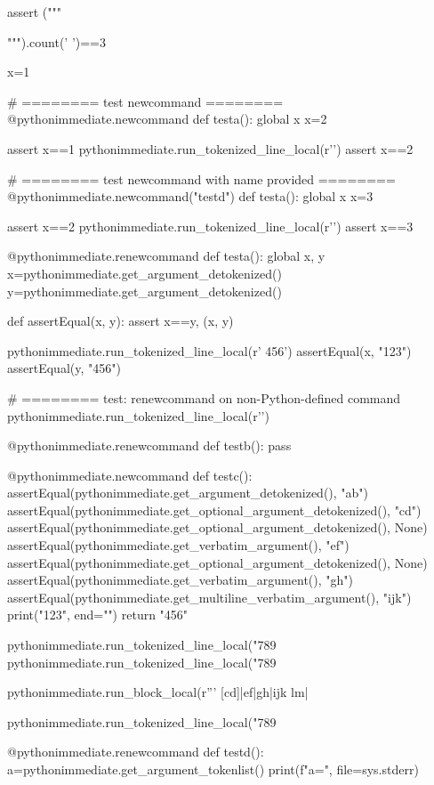 \documentclass[a5paper]{article}
\begin{document}
\begin{pycode}
assert ("""
   
""").count(' ')==3

x=1

# ======== test newcommand ========
@pythonimmediate.newcommand
def testa():
	global x
	x=2

assert x==1
pythonimmediate.run_tokenized_line_local(r'\testa')
assert x==2

# ======== test newcommand with name provided ========
@pythonimmediate.newcommand("testd")
def testa():
	global x
	x=3

assert x==2
pythonimmediate.run_tokenized_line_local(r'\testd')
assert x==3

@pythonimmediate.renewcommand
def testa():
	global x, y
	x=pythonimmediate.get_argument_detokenized()
	y=pythonimmediate.get_argument_detokenized()


def assertEqual(x, y):
	assert x==y, (x, y)


pythonimmediate.run_tokenized_line_local(r' {456}')
assertEqual(x, "123")
assertEqual(y, "456")


# ======== test: renewcommand on non-Python-defined command
pythonimmediate.run_tokenized_line_local(r'\def \testb {}')

@pythonimmediate.renewcommand
def testb(): pass



@pythonimmediate.newcommand
def testc():
	assertEqual(pythonimmediate.get_argument_detokenized(), "ab")
	assertEqual(pythonimmediate.get_optional_argument_detokenized(), "cd")
	assertEqual(pythonimmediate.get_optional_argument_detokenized(), None)
	assertEqual(pythonimmediate.get_verbatim_argument(), "ef")
	assertEqual(pythonimmediate.get_optional_argument_detokenized(), None)
	assertEqual(pythonimmediate.get_verbatim_argument(), "gh")
	assertEqual(pythonimmediate.get_multiline_verbatim_argument(), "ijk\nlm")
	print("123", end="")
	return "456"

pythonimmediate.run_tokenized_line_local("789%
pythonimmediate.run_tokenized_line_local("789%

pythonimmediate.run_block_local(r''' [cd]|ef|{gh}|ijk
lm|%

pythonimmediate.run_tokenized_line_local("789%



@pythonimmediate.renewcommand
def testd():
	a=pythonimmediate.get_argument_tokenlist()
	print(f"{a=}", file=sys.stderr)


\end{pycode}
\end{document}

